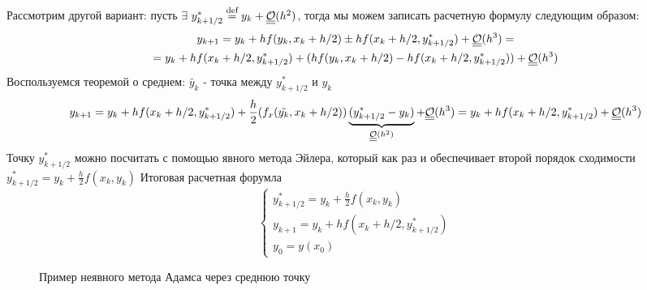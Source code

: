 Рассмотрим другой вариант: пусть $\exists\ y_{k+1/2}^*\defeq y_k+\bigO(h^2)$, тогда
мы можем записать расчетную формулу следующим образом:
\begin{multline*}
  y_{k+1}=y_{k}+hf(y_k, x_k+h/2)\pm hf(x_k+h/2,y_{k+1/2}^*)+\underline{\underline{\mathcal{O}}}(h^3)= \\
  = y_{k}+hf(x_k+h/2,y_{k+1/2}^*)+ (hf(y_k, x_k+h/2)-hf(x_k+h/2,y_{k+1/2}^*))+\underline{\underline{\mathcal{O}}}(h^3)
\end{multline*}
Воспользуемся теоремой о среднем: $\tilde{y_k}$ - точка между $y_{k+1/2}^*$ и $y_k$
\[y_{k+1}= y_{k}+hf(x_k+h/2,y_{k+1/2}^*)+ \frac{h}{2}(f_x(\tilde{y_k}, x_k+h/2))\underbrace{(y_{k+1/2}^*-y_k)}_{\underline{\underline{\mathcal{O}}}(h^2)}+\underline{\underline{\mathcal{O}}}(h^3)=y_{k}+hf(x_k+h/2,y_{k+1/2}^*)+\underline{\underline{\mathcal{O}}}(h^3)\]
Точку $y_{k+1/2}^*$ можно посчитать с помощью явного метода Эйлера,
который как раз и обеспечивает второй порядок сходимости $y_{k+1/2}^*=y_k+\frac{h}{2}f(x_k,y_k)$
Итоговая расчетная форумла
\[\begin{cases}
    y_{k+1/2}^*=y_k+\frac{h}{2}f(x_k,y_k) \\
    y_{k+1}=y_{k}+hf(x_k+h/2,y_{k+1/2}^*) \\
    y_0=y(x_0)
  \end{cases}\]

\begin{figure}[h]
  \centering
  \caption{Пример неявного метода Адамса через среднюю точку}
\end{figure}


